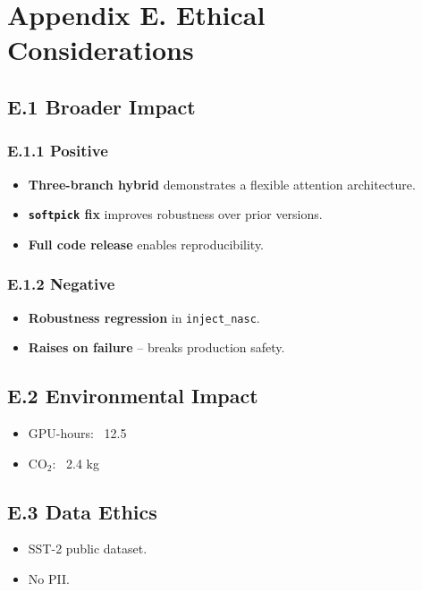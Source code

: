 
\section{Appendix E. Ethical Considerations}

\subsection{E.1 Broader Impact}

\subsubsection{E.1.1 Positive}

\begin{itemize}
\item \textbf{Three-branch hybrid} demonstrates a flexible attention architecture.
\item \textbf{\texttt{softpick} fix} improves robustness over prior versions.
\item \textbf{Full code release} enables reproducibility.

\end{itemize}
\subsubsection{E.1.2 Negative}

\begin{itemize}
\item \textbf{Robustness regression} in \texttt{inject\_nasc}.
\item \textbf{Raises on failure} -- breaks production safety.

\end{itemize}
\subsection{E.2 Environmental Impact}

\begin{itemize}
\item GPU-hours: ~12.5
\item CO$_2$: ~2.4 kg

\end{itemize}
\subsection{E.3 Data Ethics}

\begin{itemize}
\item SST-2 public dataset.
\item No PII.

\end{itemize}
